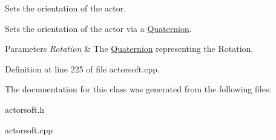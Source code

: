 Sets the orientation of the actor. 

Sets the orientation of the actor via a \hyperlink{classMezzanine_1_1Quaternion}{Quaternion}. 
\begin{DoxyParams}{Parameters}
{\em Rotation} & The \hyperlink{classMezzanine_1_1Quaternion}{Quaternion} representing the Rotation. \\
\hline
\end{DoxyParams}


Definition at line 225 of file actorsoft.\-cpp.



The documentation for this class was generated from the following files\-:\begin{DoxyCompactItemize}
\item 
actorsoft.\-h\item 
actorsoft.\-cpp\end{DoxyCompactItemize}
